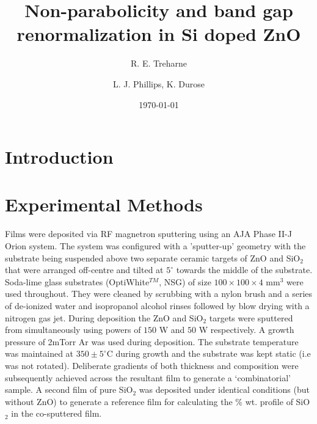 \documentclass[aps,prl,5p,showpacs,showkeys,twocolumn]{revtex4-1}
\begin{document}
\title{Non-parabolicity and band gap renormalization in Si doped ZnO}
\author{R. E. Treharne}
\author{L. J. Phillips, K. Durose}
\date{\today}
\begin{abstract}
\end{abstract}
\maketitle

\section{Introduction}



\section{Experimental Methods}

Films were deposited via RF magnetron sputtering using an AJA Phase II-J Orion system. The system was configured with a 'sputter-up' geometry with the substrate being suspended above two separate ceramic targets of ZnO and SiO$_2$ that were arranged off-centre and tilted at $5^{\circ}$ towards the middle of the substrate.  Soda-lime glass substrates (OptiWhite$^{TM}$, NSG) of size $100\times100\times4$ mm$^{3}$ were used throughout. They were cleaned by scrubbing with a nylon brush and a series of de-ionized water and isopropanol alcohol rinses followed by blow drying with a nitrogen gas jet. During deposition the ZnO and SiO$_2$ targets were sputtered from simultaneously using powers of $150$ W and $50$ W respectively. A growth pressure of 2mTorr Ar was used during deposition. The substrate temperature was maintained at $350\pm5^{\circ}$C during growth and the substrate was kept static (i.e was not rotated). Deliberate gradients of both thickness and composition were subsequently achieved across the resultant film to generate a `combinatorial' sample. A second film of pure SiO$_{2}$ was deposited under identical conditions (but without ZnO) to generate a reference film for calculating the \% wt. profile of SiO$_{2}$ in the co-sputtered film.
\end{document}
